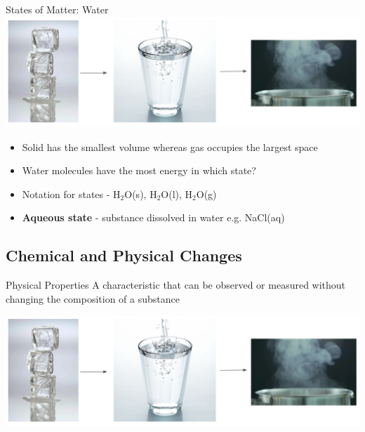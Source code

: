 \documentclass[11pt]{beamer}
\begin{document}
\begin{frame}{States of Matter: Water}
  \centering
  \includegraphics[width=\linewidth]{water_states}
  \vspace{-0.2in}
  \begin{itemize}
  \item Solid has the smallest volume whereas gas occupies
    the largest space
  \item Water molecules have the most energy in which state?
  \item Notation for states - H$_2$O(s), H$_2$O(l), H$_2$O(g)
  \item \textbf{Aqueous state} - substance dissolved in water
    e.g. NaCl(aq)
  \end{itemize}
\end{frame}

\subsection{Chemical and Physical Changes}

\begin{frame}{Physical Properties}
  A characteristic that can be observed or measured without
  changing the composition of a substance
  
  \centering
  \includegraphics[width=\linewidth]{water_states}
\end{frame}
\end{document}

